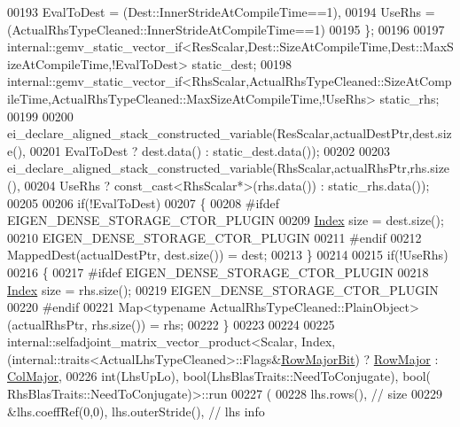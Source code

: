 \begin{DoxyCode}
00193       EvalToDest = (Dest::InnerStrideAtCompileTime==1),
00194       UseRhs = (ActualRhsTypeCleaned::InnerStrideAtCompileTime==1)
00195     \};
00196     
00197     
      internal::gemv\_static\_vector\_if<ResScalar,Dest::SizeAtCompileTime,Dest::MaxSizeAtCompileTime,!EvalToDest> static\_dest;
00198     
      internal::gemv\_static\_vector\_if<RhsScalar,ActualRhsTypeCleaned::SizeAtCompileTime,ActualRhsTypeCleaned::MaxSizeAtCompileTime,!UseRhs> static\_rhs;
00199 
00200     ei\_declare\_aligned\_stack\_constructed\_variable(ResScalar,actualDestPtr,dest.size(),
00201                                                   EvalToDest ? dest.data() : static\_dest.data());
00202                                                   
00203     ei\_declare\_aligned\_stack\_constructed\_variable(RhsScalar,actualRhsPtr,rhs.size(),
00204         UseRhs ? \textcolor{keyword}{const\_cast<}RhsScalar*\textcolor{keyword}{>}(rhs.data()) : static\_rhs.data());
00205     
00206     \textcolor{keywordflow}{if}(!EvalToDest)
00207     \{
00208 \textcolor{preprocessor}{      #ifdef EIGEN\_DENSE\_STORAGE\_CTOR\_PLUGIN}
00209       \hyperlink{namespace_eigen_a62e77e0933482dafde8fe197d9a2cfde}{Index} size = dest.size();
00210       EIGEN\_DENSE\_STORAGE\_CTOR\_PLUGIN
00211 \textcolor{preprocessor}{      #endif}
00212       MappedDest(actualDestPtr, dest.size()) = dest;
00213     \}
00214       
00215     \textcolor{keywordflow}{if}(!UseRhs)
00216     \{
00217 \textcolor{preprocessor}{      #ifdef EIGEN\_DENSE\_STORAGE\_CTOR\_PLUGIN}
00218       \hyperlink{namespace_eigen_a62e77e0933482dafde8fe197d9a2cfde}{Index} size = rhs.size();
00219       EIGEN\_DENSE\_STORAGE\_CTOR\_PLUGIN
00220 \textcolor{preprocessor}{      #endif}
00221       Map<typename ActualRhsTypeCleaned::PlainObject>(actualRhsPtr, rhs.size()) = rhs;
00222     \}
00223       
00224       
00225     internal::selfadjoint\_matrix\_vector\_product<Scalar, Index,
       (internal::traits<ActualLhsTypeCleaned>::Flags&\hyperlink{group__flags_gae4f56c2a60bbe4bd2e44c5b19cbe8762}{RowMajorBit}) ? \hyperlink{group__enums_ggaacded1a18ae58b0f554751f6cdf9eb13acfcde9cd8677c5f7caf6bd603666aae3}{RowMajor} : \hyperlink{group__enums_ggaacded1a18ae58b0f554751f6cdf9eb13a0cbd4bdd0abcfc0224c5fcb5e4f6669a}{ColMajor},
00226                                                 \textcolor{keywordtype}{int}(LhsUpLo), bool(LhsBlasTraits::NeedToConjugate), bool(
      RhsBlasTraits::NeedToConjugate)>::run
00227       (
00228         lhs.rows(),                             \textcolor{comment}{// size}
00229         &lhs.coeffRef(0,0),  lhs.outerStride(), \textcolor{comment}{// lhs info}

\end{DoxyCode}
